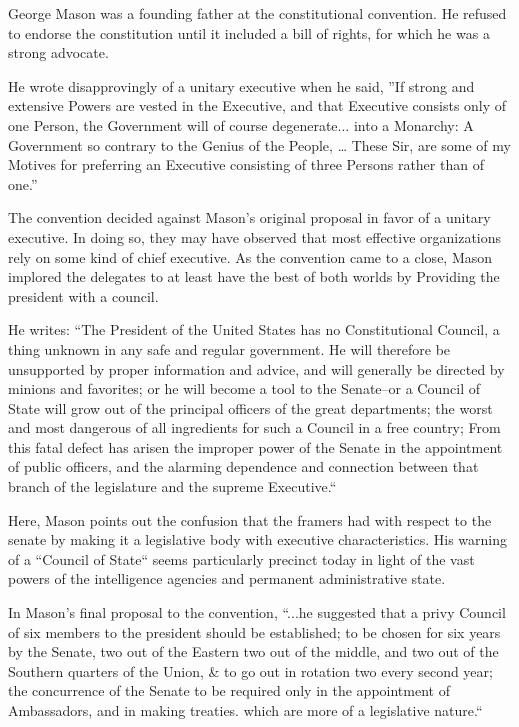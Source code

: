 \documentclass{article}
\begin{document}
George Mason was a founding father at the constitutional convention. He refused to endorse the constitution until it included a bill of rights, for which he was a strong advocate.

He wrote disapprovingly of a unitary executive when he said, ”If strong and extensive Powers are vested in the Executive, and that Executive consists only of one Person, the Government will of course degenerate... into a Monarchy: A Government so contrary to the Genius of the People, … These Sir, are some of my Motives for preferring an Executive consisting of three Persons rather than of one.”\cite{Mason}

The convention decided against Mason's original proposal in favor of a unitary executive. In doing so, they may have observed that most effective organizations rely on some kind of chief executive. As the convention came to a close, Mason implored the delegates to at least have the best of both worlds by Providing the president with a council.

He writes: “The President of the United States has no Constitutional Council, a thing unknown in any safe and regular government. He will therefore be unsupported by proper information and advice, and will generally be directed by minions and favorites; or he will become a tool to the Senate--or a Council of State will grow out of the principal officers of the great departments; the worst and most dangerous of all ingredients for such a Council in a free country; From this fatal defect has arisen the improper power of the Senate in the appointment of public officers, and the alarming dependence and connection between that branch of the legislature and the supreme Executive.“\cite{Mason_Objection}

Here, Mason points out the confusion that the framers had with respect to the senate by making it a legislative body with executive characteristics. His warning of a “Council of State“ seems particularly precinct today in light of the vast powers of the intelligence agencies and permanent administrative state.\cite{Cooper}

In Mason's final proposal to the convention, “...he suggested that a privy Council of six members to the president should be established; to be chosen for six years by the Senate, two out of the Eastern two out of the middle, and two out of the Southern quarters of the Union, \& to go out in rotation two every second year; the concurrence of the Senate to be required only in the appointment of Ambassadors, and in making treaties. which are more of a legislative nature.“\cite{Madison}
\end{document}
